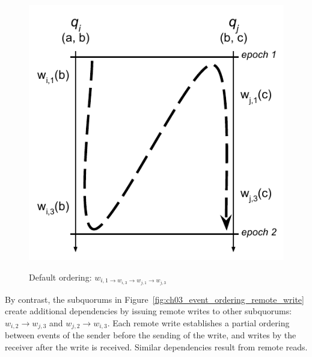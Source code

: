 \begin{figure}
    \begin{center}
        \includegraphics[width=5in]{figures/ch03_event_ordering.pdf}
    \end{center}
    \renewcommand{\baselinestretch}{1}
    \small\normalsize

    \begin{quote}
        \caption[Sequential Event Ordering in HC]{Default ordering: $w_{i,1\rightarrow w_{i,3}\rightarrow w_{j,1}\rightarrow w_{j,3}}$}
        \label{fig:ch03_event_ordering}
    \end{quote}
\end{figure}
\renewcommand{\baselinestretch}{2}
\small\normalsize

By contrast, the subquorums in Figure~\ref{fig:ch03_event_ordering_remote_write} create additional dependencies by issuing remote writes to other subquorums: $w_{i,2} \rightarrow w_{j,3}$ and $w_{j,2} \rightarrow w_{i,3}$.
Each remote write establishes a partial ordering between events of the sender before the sending of the write, and writes by the receiver after the write is received.
Similar dependencies result from remote reads.


